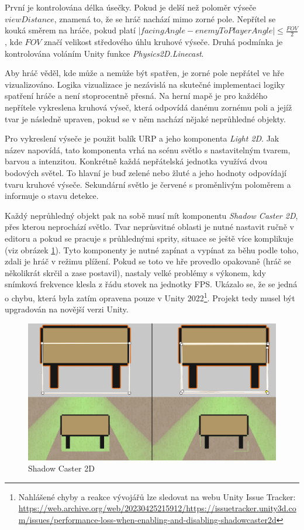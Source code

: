 \documentclass[FM,Proj]{tulthesis}
\begin{document}
	První je kontrolována délka úsečky. Pokud je delší než poloměr výseče $viewDistance$, znamená to, že se hráč nachází mimo zorné pole. Nepřítel se kouká směrem na hráče, pokud platí $|facingAngle - enemyToPlayerAngle| \le \frac{FOV}{2}$, kde $FOV$ značí velikost středového úhlu kruhové výseče. Druhá podmínka je kontrolována voláním Unity funkce \textit{Physics2D.Linecast}.
		
	Aby hráč věděl, kde může a nemůže být spatřen, je zorné pole nepřátel ve hře vizualizováno. Logika vizualizace je nezávislá na skutečné implementaci logiky spatření hráče a není stoprocentně přesná. Na herní mapě je pro každého nepřítele vykreslena kruhová výseč, která odpovídá danému zornému poli a jejíž tvar je následně upraven, pokud se v něm nachází nějaké neprůhledné objekty.
	
	Pro vykreslení výseče je použit balík URP a jeho komponenta \textit{Light 2D}. Jak název napovídá, tato komponenta vrhá na scénu světlo s nastavitelným tvarem, barvou a intenzitou. Konkrétně každá nepřátelská jednotka využívá dvou bodových světel. To hlavní je buď zelené nebo žluté a jeho hodnoty odpovídají tvaru kruhové výseče. Sekundární světlo je červené s proměnlivým poloměrem a informuje o stavu detekce.
	
	Každý neprůhledný objekt pak na sobě musí mít komponentu \textit{Shadow Caster 2D}, přes kterou neprochází světlo. Tvar neprůsvitné oblasti je nutné nastavit ručně v editoru a pokud se pracuje s průhlednými sprity, situace se ještě více komplikuje (viz obrázek \ref{imgSC2D}). Tyto komponenty je nutné zapínat a vypínat za běhu podle toho, zdali je hráč v režimu plížení. Pokud se toto ve hře provedlo opakovaně (hráč se několikrát skrčil a zase postavil), nastaly velké problémy s výkonem, kdy snímková frekvence klesla z řádu stovek na jednotky FPS. Ukázalo se, že se jedná o chybu, která byla zatím opravena pouze v Unity 2022\footnote{Nahlášené chyby a reakce vývojářů lze sledovat na webu Unity Issue Tracker:\\ \url{https://web.archive.org/web/20230425215912/https://issuetracker.unity3d.com/issues/performance-loss-when-enabling-and-disabling-shadowcaster2d}}. Projekt tedy musel být upgradován na novější verzi Unity.
	
	\begin{figure}[ht]
		\centering
		\includegraphics[width=.75\textwidth]{img/ShadowCaster}
		\caption{Shadow Caster 2D}
		\label{imgSC2D}
	\end{figure}
	
\end{document}
